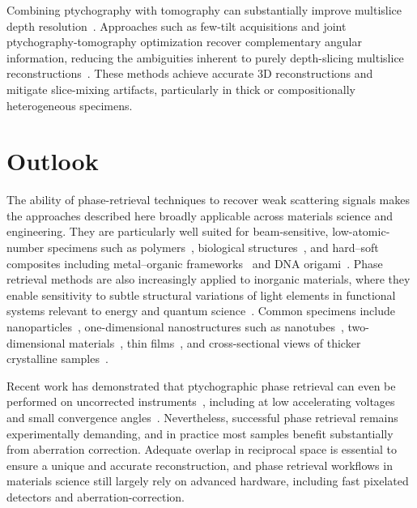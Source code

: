 \documentclass[pdflatex,sn-aps,iicol]{sn-jnl}%
\begin{document}
Combining ptychography with tomography can substantially improve multislice depth resolution~\cite{chen2024imaging,allars2025depth}.
Approaches such as few-tilt acquisitions and joint ptychography-tomography optimization recover complementary angular information, reducing the ambiguities inherent to purely depth-slicing multislice reconstructions~\cite{Lee_2023,You_2024,Dong_2025}.
These methods achieve accurate 3D reconstructions and mitigate slice-mixing artifacts, particularly in thick or compositionally heterogeneous specimens.

\section{Outlook}

The ability of phase-retrieval techniques to recover weak scattering signals makes the approaches described here broadly applicable across materials science and engineering.
They are particularly well suited for beam-sensitive, low-atomic-number specimens such as polymers~\cite{bardot2025mechanically}, biological structures~\cite{Berk_2024,Yu_2025,Spoth_2017}, and hard–soft composites including metal–organic frameworks~\cite{Ma_2025,shen2020imaging} and DNA origami~\cite{ding2022three}.
Phase retrieval methods are also increasingly applied to inorganic materials, where they enable sensitivity to subtle structural variations of light elements in functional systems relevant to energy and quantum science~\cite{lozano2018low,kp2025electron}.
Common specimens include nanoparticles~\cite{shi2025electron,Ribet_2024,Varnavides_2023}, one-dimensional nanostructures such as nanotubes~\cite{yang2016simultaneous,pelz2023solving}, two-dimensional materials~\cite{jiang2018electron,o2022increasing,Susi_2025,byrne2025fabrication,zhang2025atom}, thin films~\cite{dong2025sub}, and cross-sectional views of thicker crystalline samples~\cite{scheid2025atomic,chen2024imaging}.

Recent work has demonstrated that ptychographic phase retrieval can even be performed on uncorrected instruments~\cite{nguyen2024achieving}, including at low accelerating voltages and small convergence angles~\cite{blackburn2025sub}.
Nevertheless, successful phase retrieval remains experimentally demanding, and in practice most samples benefit substantially from aberration correction.
Adequate overlap in reciprocal space is essential to ensure a unique and accurate reconstruction, and phase retrieval workflows in materials science still largely rely on advanced hardware, including fast pixelated detectors and aberration-correction.
\end{document}
